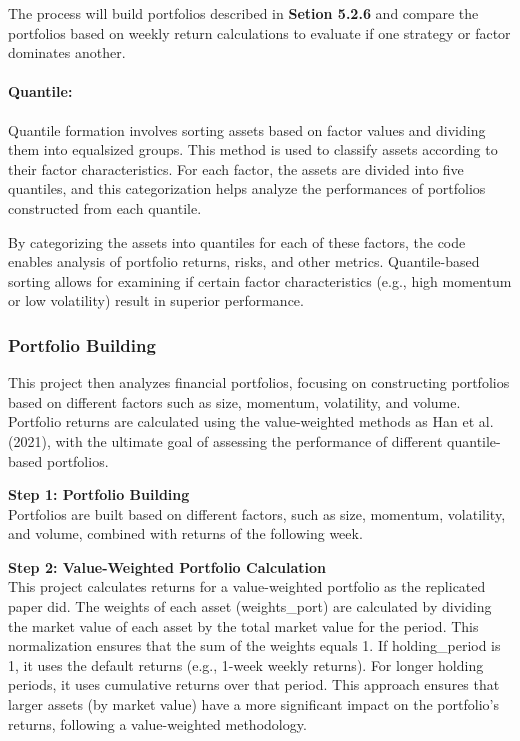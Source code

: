 \documentclass{article}
\begin{document}
The process will build portfolios described in {\bf Setion 5.2.6} and compare the portfolios based on weekly return calculations to evaluate if one strategy or factor dominates another. 

\paragraph{Quantile:}
Quantile formation involves sorting assets based on factor values and dividing them into equalsized groups. This method is used to classify assets according to their factor characteristics. For each factor, the assets are divided into five quantiles, and this categorization helps analyze the performances of portfolios 
constructed from each quantile. 

By categorizing the assets into quantiles for each of these factors, the code enables analysis of portfolio returns, risks, and other metrics. Quantile-based sorting allows for examining if certain factor characteristics (e.g., high momentum or low volatility) result in superior performance.



\hypertarget{Portfolio Building}{%
\subsubsection{Portfolio Building}\label{Portfolio Building}}
This project then analyzes financial portfolios, focusing on constructing portfolios based on different factors such as size, momentum, volatility, and volume. Portfolio returns are calculated using the value-weighted methods as Han et al. (2021), with the ultimate goal of assessing the performance of different quantile-based portfolios.

\textbf{Step 1: Portfolio Building}\\
Portfolios are built based on different factors, such as size, momentum, volatility, and volume, combined with returns of the following week.

\textbf{Step 2: Value-Weighted Portfolio Calculation}\\
This project calculates returns for a value-weighted portfolio as the replicated paper did. The weights of each asset (weights\_port) are calculated by dividing the market value of each asset by the total market value for the period. This normalization ensures that the sum of the weights equals 1. If holding\_period is 1, it uses the default returns (e.g., 1-week weekly returns). For longer holding periods, it uses cumulative returns over that period.
This approach ensures that larger assets (by market value) have a more significant impact on the portfolio's returns, following a value-weighted methodology. 
\end{document}
